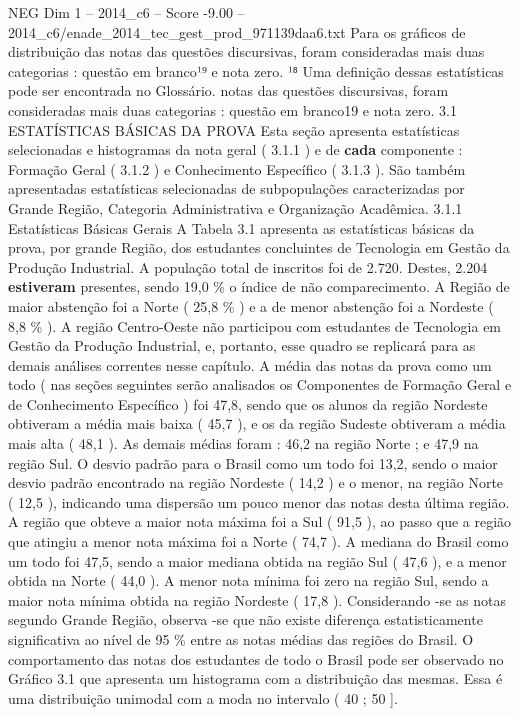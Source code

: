 \begin{textsample}{NEG Dim 1 – 2014\_c6 – Score -9.00 – 2014\_c6/enade\_2014\_tec\_gest\_prod\_971139daa6.txt}
Para os gráficos de distribuição das notas das questões discursivas, foram consideradas mais duas categorias : questão em branco¹⁹ e nota zero. ¹⁸ Uma definição dessas estatísticas pode ser encontrada no Glossário. notas das questões discursivas, foram consideradas mais duas categorias : questão em branco19 e nota zero. 3.1 ESTATÍSTICAS BÁSICAS DA PROVA Esta seção apresenta estatísticas selecionadas e histogramas da nota geral ( 3.1.1 ) e de \textbf{cada} componente : Formação Geral ( 3.1.2 ) e Conhecimento Específico ( 3.1.3 ).
São também apresentadas estatísticas selecionadas de subpopulações caracterizadas por Grande Região, Categoria Administrativa e Organização Acadêmica. 3.1.1 Estatísticas Básicas Gerais A Tabela 3.1 apresenta as estatísticas básicas da prova, por grande Região, dos estudantes concluintes de Tecnologia em Gestão da Produção Industrial.
A população total de inscritos foi de 2.720.
Destes, 2.204 \textbf{estiveram} presentes, sendo 19,0 \% o índice de não comparecimento.
A Região de maior abstenção foi a Norte ( 25,8 \% ) e a de menor abstenção foi a Nordeste ( 8,8 \% ).
A região Centro-Oeste não participou com estudantes de Tecnologia em Gestão da Produção Industrial, e, portanto, esse quadro se replicará para as demais análises correntes nesse capítulo.
A média das notas da prova como um todo ( nas seções seguintes serão analisados os Componentes de Formação Geral e de Conhecimento Específico ) foi 47,8, sendo que os alunos da região Nordeste obtiveram a média mais baixa ( 45,7 ), e os da região Sudeste obtiveram a média mais alta ( 48,1 ).
As demais médias foram : 46,2 na região Norte ; e 47,9 na região Sul.
O desvio padrão para o Brasil como um todo foi 13,2, sendo o maior desvio padrão encontrado na região Nordeste ( 14,2 ) e o menor, na região Norte ( 12,5 ), indicando uma dispersão um pouco menor das notas desta última região.
A região que obteve a maior nota máxima foi a Sul ( 91,5 ), ao passo que a região que atingiu a menor nota máxima foi a Norte ( 74,7 ).
A mediana do Brasil como um todo foi 47,5, sendo a maior mediana obtida na região Sul ( 47,6 ), e a menor obtida na Norte ( 44,0 ).
A menor nota mínima foi zero na região Sul, sendo a maior nota mínima obtida na região Nordeste ( 17,8 ).
Considerando -se as notas segundo Grande Região, observa -se que não existe diferença estatisticamente significativa ao nível de 95 \% entre as notas médias das regiões do Brasil.
O comportamento das notas dos estudantes de todo o Brasil pode ser observado no Gráfico 3.1 que apresenta um histograma com a distribuição das mesmas.
Essa é uma distribuição unimodal com a moda no intervalo ( 40 ; 50 ].

\end{textsample}
